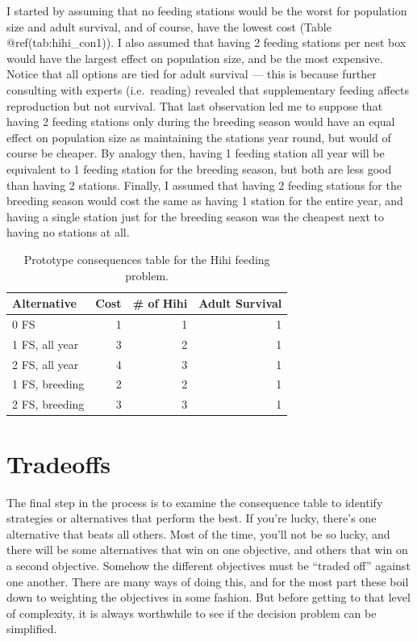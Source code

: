 \documentclass[]{book}
\begin{document}
I started by assuming that no feeding stations would be the worst for
population size and adult survival, and of course, have the lowest cost
(Table @ref(tab:hihi\_con1)). I also assumed that having 2 feeding
stations per nest box would have the largest effect on population size,
and be the most expensive. Notice that all options are tied for adult
survival --- this is because further consulting with experts
(i.e.~reading) revealed that supplementary feeding affects reproduction
but not survival. That last observation led me to suppose that having 2
feeding stations only during the breeding season would have an equal
effect on population size as maintaining the stations year round, but
would of course be cheaper. By analogy then, having 1 feeding station
all year will be equivalent to 1 feeding station for the breeding
season, but both are less good than having 2 stations. Finally, I
assumed that having 2 feeding stations for the breeding season would
cost the same as having 1 station for the entire year, and having a
single station just for the breeding season was the cheapest next to
having no stations at all.

\begin{table}[tbp]
\caption{Prototype consequences table for the Hihi feeding problem.\label{tab:hihi_con1}}
\begin{tabular}{lrrr}
\toprule
   \textbf{Alternative}
  &\textbf{Cost}
  &\textbf{\# of Hihi}
  &\textbf{Adult Survival}
\\\midrule
   0 FS           & 1 & 1 & 1 
\\ 1 FS, all year & 3 & 2 & 1
\\ 2 FS, all year & 4 & 3 & 1
\\ 1 FS, breeding & 2 & 2 & 1
\\ 2 FS, breeding & 3 & 3 & 1
\\\bottomrule
\end{tabular}
\end{table}

\section{Tradeoffs}\label{tradeoffs}

The final step in the process is to examine the consequence table to
identify strategies or alternatives that perform the best. If you're
lucky, there's one alternative that beats all others. Most of the time,
you'll not be so lucky, and there will be some alternatives that win on
one objective, and others that win on a second objective. Somehow the
different objectives must be ``traded off'' against one another. There
are many ways of doing this, and for the most part these boil down to
weighting the objectives in some fashion. But before getting to that
level of complexity, it is always worthwhile to see if the decision
problem can be simplified.
\end{document}

